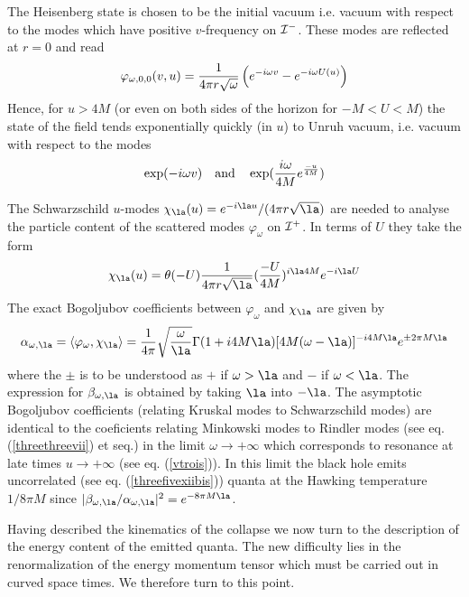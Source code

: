 \documentclass[12pt]{article}
\begin{document}
The Heisenberg state is chosen to be the initial vacuum
i.e. vacuum with respect to the modes which have positive
$v$-frequency on ${\cal I}^-$. These modes are reflected at $r=0$ and read
\begin{equation}
\varphi_{\omega,0,0}(v,u) = {1 \over 4 \pi r \sqrt{\omega}}
\left( e^{-i \omega v} - e^{-i\omega U(u)} \right)
\label{modesphi}
\end{equation}
Hence, for $u > 4M$ (or even on both sides of the horizon for $-M < U < M$)
 the state of the field tends exponentially quickly (in $u$) to Unruh
vacuum\cite{Unruh}, i.e.
vacuum with respect to the modes
\begin{equation}
\exp(-i \omega v) \quad {\hbox{and}}\quad \exp({i\omega \over 4
M} e^{-u\over 4
M})
\end{equation}

The Schwarzschild $u$-modes  $\chi_{\la}(u)= {e^{-i\la u}}/( 4 \pi r
\sqrt{
\la}) $
are needed to analyse
the particle content
of the scattered modes
$\varphi_{\omega}$
on ${\cal I^+}$. In terms of $U$ they take the form
\begin{equation}
\chi_{\la}(u) =  \theta(- U){1 \over  4 \pi r
\sqrt{\la}}
 ({-U \over 4M} )^{i \la 4 M} e^{- i \la U}
\end{equation}
The exact Bogoljubov coefficients between $\varphi_\omega$ and $\chi_{\la}$
are given by
\begin{equation}
\alpha_{\omega,\la} =
\bk{\varphi_\omega,\chi_{\la}}
= {1 \over 4 \pi}
\sqrt{ \omega \over \la}
\Gamma ( 1 + i 4 M \la)
[ 4 M ( \omega - \la)]^{-i 4 M \la}
e^{\pm 2 \pi M \la}
\end{equation}
where the $\pm$ is to be understood as $+$ if $ \omega > \la$ and $-$
if $ \omega < \la$. The expression for $\beta_{\omega,\la}$ is obtained by
taking $\la$ into $-\la$. The asymptotic Bogoljubov coefficients
(relating Kruskal modes to Schwarzschild modes) are identical to the
coeficients
relating Minkowski modes to Rindler modes (see
eq. (\ref{threethreevii}) et seq.)
in the
limit $\omega \to + \infty$ which corresponds to resonance at late times
$u \to +\infty$ (see eq. (\ref{vtrois})). In this limit
the black hole emits uncorrelated (see eq. (\ref{threefivexiibis}))
quanta at the Hawking temperature $1/8 \pi M$
 since $\vert \beta_{\omega,\la}/ \alpha_{\omega,\la}\vert ^2 =
e^{-8 \pi M \la} $.

Having described the kinematics of the collapse we now turn to the
description of the energy content of the emitted quanta.
The
new difficulty lies in the
renormalization of the energy momentum tensor which must be carried out
in curved space times. We therefore turn to this point.
\end{document}
